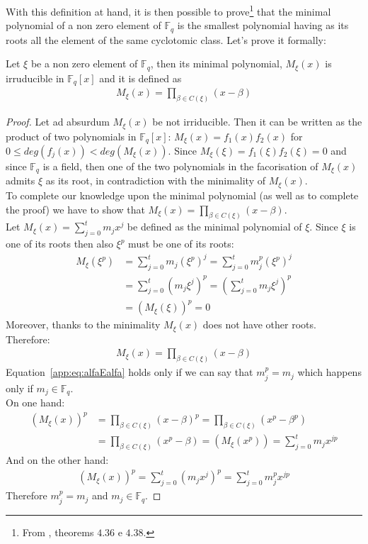 \noindent
With this definition at hand, it is then possible to prove\footnote{
   From \cite{cattaneo}, theorems $4.36$ e $4.38$.
   }
   that the minimal polynomial of a non zero element of $\mathbb{F}_{q}$ is the smallest polynomial having as its roots all the element of the same cyclotomic class. Let's prove it formally:
\begin{theorem}
   Let $\xi$ be a non zero element of $\mathbb{F}_{q}$, then its minimal polynomial, $M_{\xi}(x)$ is irruducible in $\mathbb{F}_{q}[x]$ and it is defined as
   \begin{align*}
      M_{\xi}(x) = \prod_{\beta \in C(\xi)} (x-\beta)
   \end{align*}
\end{theorem}
\begin{proof}
   Let ad absurdum $M_{\xi}(x)$ be not irriducible. Then it can be written as the product of two polynomials in $\mathbb{F}_{q}[x]$: $M_{\xi}(x) = f_{1}(x) f_{2}(x)$ for $0 \leq deg(f_{j}(x)) < deg(M_{\xi}(x))$. Since $M_{\xi}(\xi) = f_{1}(\xi) f_{2}(\xi) = 0 $ and since $\mathbb{F}_{q}$ is a field, then one of the two polynomials in the facorisation of $M_{\xi}(x)$ admits $\xi$ as its root, in contradiction with the minimality of $M_{\xi}(x)$.\\
   To complete our knowledge upon the minimal polynomial (as well as to complete the proof) we have to show that $M_{\xi}(x) = \prod_{\beta \in C(\xi)} (x-\beta)$. \\
   Let $M_{\xi}(x) = \sum_{j=0}^{t} m_{j}x^{j}$ be defined as the minimal polynomial of $\xi$. Since $\xi$ is one of its roots then also $\xi^{p}$ must be one of its roots:
   \begin{align}\label{app:eq:alfaEalfa}
       M_{\xi}(\xi^{p})
       &= \sum_{j=0}^{t} m_{j}(\xi^{p})^{j} = \sum_{j=0}^{t} m_{j}^{p}(\xi^{p})^{j} \\
       &= \sum_{j=0}^{t} (m_{j}\xi^{j})^{p} = (\sum_{j=0}^{t} m_{j}\xi^{j})^{p} \\
       &= (M_{\xi}(\xi))^{p} = 0
   \end{align}
   Moreover, thanks to the minimality $M_{\xi}(x)$ does not have other roots. Therefore:
   \begin{align*}
      M_{\xi}(x) = \prod_{\beta \in C(\xi)} (x-\beta)
   \end{align*}
   Equation~\ref{app:eq:alfaEalfa} holds only if we can say that $m_{j}^{p} = m_{j}$ which happens only if $m_{j} \in \mathbb{F}_{q}$. \\
   On one hand:
   \begin{align*}
       (M_{\xi}(x))^{p}
       &= \prod_{\beta \in C(\xi)} (x-\beta)^{p} = \prod_{\beta \in C(\xi)} (x^{p} -\beta^{p}) \\
       &= \prod_{\beta \in C(\xi)} (x^{p} -\beta) = (M_{\xi}(x^{p})) = \sum_{j=0}^{t} m_{j}x^{jp}
   \end{align*}
   And on the other hand:
   \begin{align*}
       (M_{\xi}(x))^{p} =  \sum_{j=0}^{t} (m_{j}x^{j})^{p} =  \sum_{j=0}^{t} m_{j}^{p}x^{jp}
   \end{align*}
   Therefore $m_{j}^{p} = m_{j}$ and $m_{j} \in  \mathbb{F}_{q}$.
\end{proof}

